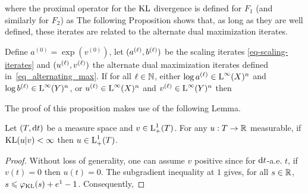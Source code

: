 where the proximal operator for the $\operatorname{KL}$ divergence is defined for $F_1$ (and similarly for $F_2$) as
%
The following Proposition shows that, as long as they are well defined, these iterates are related to the alternate dual maximization iterates.
%
\begin{proposition}
\label{prop_alternating}
Define $a^{(0)}=\exp (v^{(0)})$, let $(a^{(\ell)},b^{(\ell)})$ be the scaling iterates \eqref{eq-scaling-iterates} and $(u^{(\ell)},v^{(\ell)})$ the alternate dual maximization iterates defined in~\eqref{eq_alternating_max}.
%
If for all $\ell \in \mathbb{N}$, either $\log a^{(\ell)} \in \text{\upshape L}^\infty (X)^n$ and $\log b^{(\ell)} \in \text{\upshape L}^\infty(Y)^n$, or $u^{(\ell)}\in \text{\upshape L}^\infty(X)^n$ and $v^{(\ell)}\in \text{\upshape L}^\infty(Y)^n$ then 
\end{proposition}
%
The proof of this proposition makes use of the following Lemma. 
%
\begin{lemma}
\label{lem_KL_L1}
Let $(T,\mathrm{d} t)$ be a measure space and $v \in \text{\upshape L}^1_{+}(T)$. For any $u : T \to \mathbb{R}$ measurable, if $\operatorname{KL}(u|v)<\infty$ then $u\in \text{\upshape L}^1_{+}(T)$.
\end{lemma}
\begin{proof}
Without loss of generality, one can assume $v$ positive since for $\mathrm{d} t$-a.e. $t$, if $v(t)=0$ then $u(t)=0$. 
The subgradient inequality at $1$ gives, for all $s\in \mathbb{R}$, $s \leqslant \varphi_{\operatorname{KL}}(s)+e^1-1$. 
Consequently,
\end{proof}

